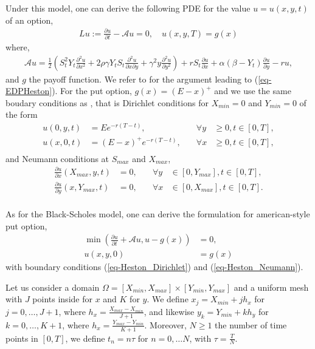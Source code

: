 \documentclass[12pt,a4paper]{article}
\newcommand{\pd}[2]{\frac{\partial {#1}}{\partial {#2}}}
\newcommand{\pdd}[2]{\frac{\partial^2 {#1}}{\partial {#2}^2}}
\newcommand{\pdc}[3]{\frac{\partial^2 {#1}}{\partial {#2} \partial {#3}}}
\begin{document}
Under this model, one can derive the following PDE for the value $u=u(x,y,t)$ of an option,
\begin{align}
	Lu := \pd{u}{t} - \mathcal{A}u = 0, \quad u(x,y,T) = g(x)\label{eq-EDPHeston}
\end{align}
where,
\begin{align}
	\mathcal{A}u = \frac{1}{2} \left( S_t^2 Y_t \pdd{u}{x} + 2 \rho \gamma Y_t S_t \pdc{u}{x}{y}+ \gamma^2 y \pdd{u}{y} \right) + r S_t \pd{u}{x} + \alpha (\beta - Y_t) \pd{u}{y} - ru, \label{eq-A_Heston}
\end{align}
and $g$ the payoff function.
We refer to \cite{Oosterlee,MR1628686} for the argument leading to (\ref{eq-EDPHeston}). For the put option, $g(x) = (E-x)^+$ and we use the same boudary conditions as \cite{Oosterlee}, that is Dirichlet conditions for $X_{min}=0$ and $Y_{min}=0$ of the form
\begin{equation}\label{eq-Heston_Dirichlet}
\begin{aligned}
	u(0, y, t) &= E e^{-r(T-t)}, \quad &\forall y &\geq 0, t \in [0,T], \\
	u(x, 0, t) &= (E-x)^+ e^{-r(T-t)}, \quad &\forall x &\geq 0, t \in [0,T], \\	
\end{aligned}
\end{equation}
and Neumann conditions at $S_{max}$ and $X_{max}$,
\begin{equation}\label{eq-Heston_Neumann}
\begin{aligned}
	\pd{u}{x}(X_{max}, y, t) &= 0, \quad &\forall y &\in [0,Y_{max}], t \in [0,T], \\
	\pd{u}{y}(x, Y_{max}, t) &= 0, \quad &\forall x &\in [0,X_{max}], t \in [0,T]. \\	
\end{aligned}
\end{equation}

As for the Black-Scholes model, one can derive the formulation for american-style put option,
\begin{equation} \label{eq-HestonObstacle}
\begin{aligned}
	\min \left( \pd{u}{t} + \mathcal{A}u, u - g(x) \right) &= 0, \\
	u(x, y, 0) &= g(x)
\end{aligned}
\end{equation}
with boundary conditions (\ref{eq-Heston_Dirichlet}) and (\ref{eq-Heston_Neumann}).

Let us consider a domain $\Omega = [X_{min}, X_{max}] \times [Y_{min}, Y_{max}]$ and a uniform mesh with $J$ points inside for $x$ and $K$ for $y$. We define $x_j = X_{min} + jh_x$ for $j = 0, \dots, J+1$, where $h_x = \frac{X_{max} - X_{min}}{J+1}$, and likewise $y_k = Y_{min} + kh_y$ for $k = 0, \dots, K+1$, where $h_x = \frac{Y_{max} - Y_{min}}{K+1}$. Moreover, $N \geq 1$ the number of time points in $[0,T]$, we define $t_n = n \tau$ for $n = 0, \dots N$, with $\tau = \frac{T}{N}$.
\end{document}
